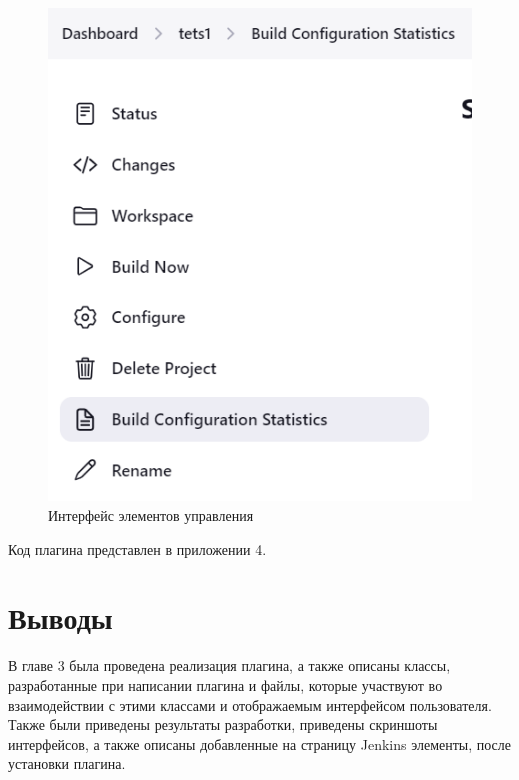 \begin{figure}[ht!] 
	\center
	\includegraphics [scale=0.47] {my_folder/images//ui3}
	\caption{Интерфейс элементов управления} 
	\label{fig:ui3}  
\end{figure}


Код плагина представлен в приложении 4.
 
\section{Выводы} \label{ch3:sec3}

В главе 3 была проведена реализация плагина, а также описаны классы, разработанные при написании плагина и файлы, которые участвуют во взаимодействии с этими классами и отображаемым интерфейсом пользователя. Также были приведены результаты разработки, приведены скриншоты интерфейсов, а также описаны добавленные на страницу Jenkins элементы, после установки плагина.





%
%


